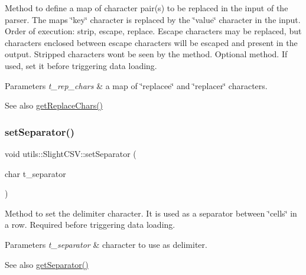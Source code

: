 Method to define a map of character pair(s) to be replaced in the input of the parser. The map\textquotesingle{}s \char`\"{}key\char`\"{} character is replaced by the \char`\"{}value\char`\"{} character in the input. Order of execution\+: strip, escape, replace. Escape characters may be replaced, but characters enclosed between escape characters will be escaped and present in the output. Stripped characters won\textquotesingle{}t be seen by the method. Optional method. If used, set it before triggering data loading. 
\begin{DoxyParams}{Parameters}
{\em t\+\_\+rep\+\_\+chars} & a map of \char`\"{}replacee\char`\"{} and \char`\"{}replacer\char`\"{} characters. \\
\hline
\end{DoxyParams}
\begin{DoxySeeAlso}{See also}
\hyperlink{classutils_1_1SlightCSV_aa28076f9867ef095802adbe0d8f966fb}{get\+Replace\+Chars()} 
\end{DoxySeeAlso}
\mbox{\label{classutils_1_1SlightCSV_ab8cb026f9b404ef76e62eae60aecb999}} 
\subsubsection{\texorpdfstring{set\+Separator()}{setSeparator()}}
{\footnotesize\ttfamily void utils\+::\+Slight\+C\+S\+V\+::set\+Separator (\begin{DoxyParamCaption}\item[{char}]{t\+\_\+separator }\end{DoxyParamCaption})}

Method to set the delimiter character. It is used as a separator between \char`\"{}cells\char`\"{} in a row. Required before triggering data loading. 
\begin{DoxyParams}{Parameters}
{\em t\+\_\+separator} & character to use as delimiter. \\
\hline
\end{DoxyParams}
\begin{DoxySeeAlso}{See also}
\hyperlink{classutils_1_1SlightCSV_a72cb5e6333d648ef09fdf556d7baf15e}{get\+Separator()} 
\end{DoxySeeAlso}
\mbox{\label{classutils_1_1SlightCSV_a8a1d201855747b4c1207ecef5ac1e2b5}} 
